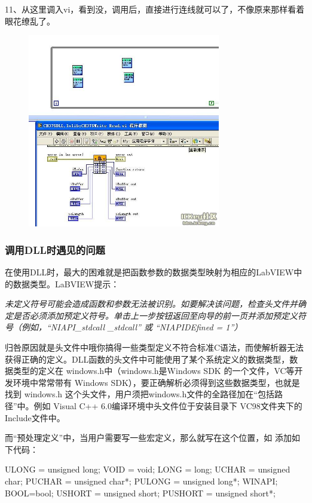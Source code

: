 11、从这里调入vi，看到没，调用后，直接进行连线就可以了，不像原来那样看着眼花缭乱了。
\begin{figure}[h!]
\centering
\includegraphics[width=0.75\textwidth]{pictures/13.jpg}
\end{figure}


\subsubsection{调用DLL时遇见的问题}
在使用DLL时，最大的困难就是把函数参数的数据类型映射为相应的LabVIEW中的数据类型。LaBVIEW提示：

{\color{blue}\emph{未定义符号可能会造成函数和参数无法被识别。如要解决该问题，检查头文件并确定是否必须添加预定义符号。单击上一步按钮返回至向导的前一页并添加预定义符号（例如，“NIAPI\_stdcall \_stdcall” 或 ``NIAPIDEfined = 1''）} }

归咎原因就是头文件中哦你搞得一些类型定义不符合标准C语法，而使解析器无法获得正确的定义。DLL函数的头文件中可能使用了某个系统定义的数据类型，数据类型的定义在 windows.h中（windows.h是Windows SDK 的一个文件，VC等开发环境中常常带有 Windows SDK），要正确解析必须得到这些数据类型，也就是找到 windows.h 这个头文件，用户须把windows.h文件的全路径加在“包括路径”中。例如 Visual C++ 6.0编译环境中头文件位于安装目录下 VC98文件夹下的 Include文件中。

而“预处理定义”中，当用户需要写一些宏定义，那么就写在这个位置，如
添加如下代码：

ULONG = unsigned long; VOID = void; LONG = long; UCHAR = unsigned char; PUCHAR = unsigned char*;
PULONG = unsigned long*; WINAPI; BOOL=bool; USHORT = unsigned short; PUSHORT = unsigned short*;

